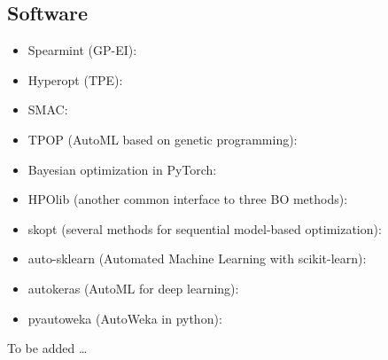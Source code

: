 \documentclass[letterpaper,10pt,english]{sphinxmanual}
\begin{document}
\subsection{Software}
\label{\detokenize{resources:software}}\begin{itemize}
\item {} 
Spearmint (GP-EI): 

\item {} 
Hyperopt (TPE): 

\item {} 
SMAC: 

\item {} 
TPOP (AutoML based on genetic programming): 

\item {} 
Bayesian optimization in PyTorch: 

\item {} 
HPOlib (another common interface to three BO methods): 

\item {} 
skopt (several methods for sequential model-based optimization): 

\item {} 
auto-sklearn (Automated Machine Learning with scikit-learn): 

\item {} 
autokeras (AutoML for deep learning): 

\item {} 
pyautoweka (AutoWeka in python): 

\end{itemize}

To be added …
\end{document}
